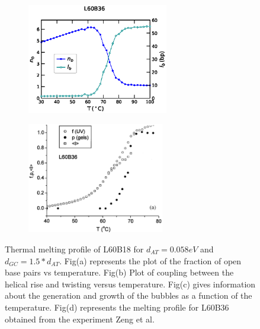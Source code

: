 \documentclass[12pt,masters,final]{UTRGVthesis}
\begin{document}
\begin{figure}[!h]
        \begin{subfigure}[b]{0.49\textwidth}
                \centering
                \includegraphics[height=1.9in, width=.8\textwidth]{L60B36_temp_bub.eps}
                \caption{}
                \label{fig:L60B36bub}
        \end{subfigure}%
        \begin{subfigure}[b]{0.49\textwidth}
                \centering
                \includegraphics[height=1.9in, width=.8\textwidth]{exp_L60B36.eps}
                \caption{}
                \label{fig:L60B36exp}
        \end{subfigure}%
       
       
\caption{Thermal melting profile of L60B18 for $d_{AT}=0.058 eV$ and $d_{GC}=1.5*d_{AT}$. Fig(a) represents the plot of the fraction of open base pairs vs temperature. Fig(b) Plot of coupling between the helical rise and twisting versus temperature. Fig(c) gives information about the generation and growth of the bubbles as a function of the temperature. Fig(d) represents the melting profile for L60B36 obtained from the experiment Zeng et al. } 
\label{fig:L60b36cal}    

\end{figure}
% 
\newpage
\end{document}

